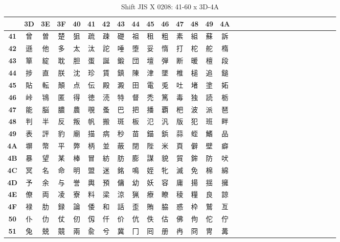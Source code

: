 \begin{table}[H]
\centering
\caption{Shift JIS X 0208: 41-60 x 3D-4A}
\begin{tabular}{|Sc|Sc|Sc|Sc|Sc|Sc|Sc|Sc|Sc|Sc|Sc|Sc|Sc|Sc|Sc|}
\hline
 & \textbf{3D} & \textbf{3E} & \textbf{3F} & \textbf{40} & \textbf{41} & \textbf{42} & \textbf{43} & \textbf{44} & \textbf{45} & \textbf{46} & \textbf{47} & \textbf{48} & \textbf{49} & \textbf{4A} \\ \hline
\textbf{41} & 曾 & 曽 & 楚 & 狙 & 疏 & 疎 & 礎 & 祖 & 租 & 粗 & 素 & 組 & 蘇 & 訴 \\ \hline
\textbf{42} & 遜 & 他 & 多 & 太 & 汰 & 詑 & 唾 & 堕 & 妥 & 惰 & 打 & 柁 & 舵 & 楕 \\ \hline
\textbf{43} & 箪 & 綻 & 耽 & 胆 & 蛋 & 誕 & 鍛 & 団 & 壇 & 弾 & 断 & 暖 & 檀 & 段 \\ \hline
\textbf{44} & 捗 & 直 & 朕 & 沈 & 珍 & 賃 & 鎮 & 陳 & 津 & 墜 & 椎 & 槌 & 追 & 鎚 \\ \hline
\textbf{45} & 貼 & 転 & 顛 & 点 & 伝 & 殿 & 澱 & 田 & 電 & 兎 & 吐 & 堵 & 塗 & 妬 \\ \hline
\textbf{46} & 峠 & 鴇 & 匿 & 得 & 徳 & 涜 & 特 & 督 & 禿 & 篤 & 毒 & 独 & 読 & 栃 \\ \hline
\textbf{47} & 能 & 脳 & 膿 & 農 & 覗 & 蚤 & 巴 & 把 & 播 & 覇 & 杷 & 波 & 派 & 琶 \\ \hline
\textbf{48} & 判 & 半 & 反 & 叛 & 帆 & 搬 & 斑 & 板 & 氾 & 汎 & 版 & 犯 & 班 & 畔 \\ \hline
\textbf{49} & 表 & 評 & 豹 & 廟 & 描 & 病 & 秒 & 苗 & 錨 & 鋲 & 蒜 & 蛭 & 鰭 & 品 \\ \hline
\textbf{4A} & 塀 & 幣 & 平 & 弊 & 柄 & 並 & 蔽 & 閉 & 陛 & 米 & 頁 & 僻 & 壁 & 癖 \\ \hline
\textbf{4B} & 暴 & 望 & 某 & 棒 & 冒 & 紡 & 肪 & 膨 & 謀 & 貌 & 貿 & 鉾 & 防 & 吠 \\ \hline
\textbf{4C} & 冥 & 名 & 命 & 明 & 盟 & 迷 & 銘 & 鳴 & 姪 & 牝 & 滅 & 免 & 棉 & 綿 \\ \hline
\textbf{4D} & 予 & 余 & 与 & 誉 & 輿 & 預 & 傭 & 幼 & 妖 & 容 & 庸 & 揚 & 揺 & 擁 \\ \hline
\textbf{4E} & 僚 & 両 & 凌 & 寮 & 料 & 梁 & 涼 & 猟 & 療 & 瞭 & 稜 & 糧 & 良 & 諒 \\ \hline
\textbf{4F} & 禄 & 肋 & 録 & 論 & 倭 & 和 & 話 & 歪 & 賄 & 脇 & 惑 & 枠 & 鷲 & 亙 \\ \hline
\textbf{50} & 仆 & 仂 & 仗 & 仞 & 仭 & 仟 & 价 & 伉 & 佚 & 估 & 佛 & 佝 & 佗 & 佇 \\ \hline
\textbf{51} & 兔 & 兢 & 竸 & 兩 & 兪 & 兮 & 冀 & 冂 & 囘 & 册 & 冉 & 冏 & 冑 & 冓 \\ \hline

\end{tabular}
\end{table}
